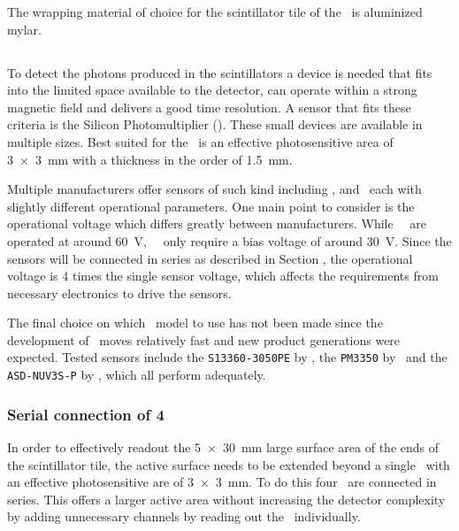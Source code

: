 \documentclass[../BTOF_summary.tex]{subfiles}
\begin{document}
The wrapping material of choice for the scintillator tile of the \btofD\ is aluminized mylar.


\subsection{\sipm}

To detect the photons produced in the scintillators a device is needed that fits into the limited space available to the detector, can operate within a strong magnetic field and delivers a good time resolution.
A sensor that fits these criteria is the Silicon Photomultiplier (\sipm ).
These small devices are available in multiple sizes.
Best suited for the \btofD\ is an effective photosensitive area of \SI{3x3}{mm} with a thickness in the order of \SI{1.5}{mm}.

Multiple manufacturers offer sensors of such kind including \hamamatsu, \ketek and \advansid\ each with slightly different operational parameters.
One main point to consider is the operational voltage which differs greatly between manufacturers.
While \hamamatsu\ \sipms\ are operated at around \SI{60}{V}, \ketek\ \sipms\ only require a bias voltage of around \SI{30}{V}.
Since the sensors will be connected in series as described in Section , the operational voltage is 4 times the single sensor voltage, which affects the requirements from necessary electronics to drive the sensors.

The final choice on which \sipm\ model to use has not been made since the development of \sipms\ moves relatively fast and new product generations were expected.
Tested sensors include the \texttt{S13360-3050PE} by \hamamatsu, the \texttt{PM3350} by \ketek\ and the \texttt{ASD-NUV3S-P} by \advansid , which all perform adequately.

\subsubsection*{Serial connection of 4 \sipms}

In order to effectively readout the \SI{5x30}{mm} large surface area of the ends of the scintillator tile, the active surface needs to be extended beyond a single \sipm\ with an effective photosensitive are of \SI{3x3}{mm}.
To do this four \sipms\ are connected in series.
This offers a larger active area without increasing the detector complexity by adding unnecessary channels by reading out the \sipms\ individually.
\end{document}
